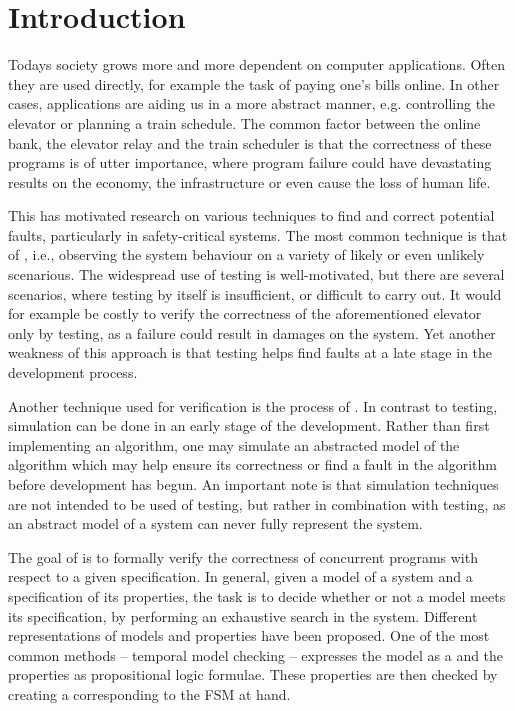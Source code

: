 \newpage
\section{Introduction}
Todays society grows more and more dependent on computer applications. Often they are used directly, for example the task of paying one's bills online. In other cases, applications are aiding us in a more abstract manner, e.g. controlling the elevator or planning a train schedule. The common factor between the online bank, the elevator relay and the train scheduler is that the correctness of these programs is of utter importance, where program failure could have devastating results on the economy, the infrastructure or even cause the loss of human life.

This has motivated research on various techniques to find and correct potential faults, particularly in safety-critical systems. The most common technique is that of , i.e., observing the system behaviour on a variety of likely or even unlikely scenarious. The widespread use of testing is well-motivated, but there are several scenarios, where testing by itself is insufficient, or difficult to carry out. It would for example be costly to verify the correctness of the aforementioned elevator only by testing, as a failure could result in damages on the system. Yet another weakness of this approach is that testing helps find faults at a late stage in the development process.

Another technique used for verification is the process of . In contrast to testing, simulation can be done in an early stage of the development. Rather than first implementing an algorithm, one may simulate an abstracted model of the algorithm which may help ensure its correctness or find a fault in the algorithm before development has begun. An important note is that simulation techniques are not intended to be used  of testing, but rather in combination with testing, as an abstract model of a system can never fully represent the system.

The goal of  is to formally verify the correctness of concurrent programs with respect to a given specification. %
In general, given a model of a system and a specification of its properties, the task is to decide whether or not a model meets its specification, by performing an exhaustive search in the system. Different representations of models and properties have been proposed. One of the most common methods -- temporal model checking -- expresses the model as a  and the properties as propositional logic formulae. These properties are then checked by creating a  corresponding to the FSM at hand.

